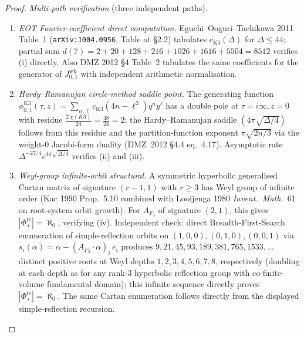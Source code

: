 \begin{proof}
\emph{Multi-path verification} (three independent paths).
\begin{enumerate}[label=(P\arabic*)]
 \item \emph{EOT Fourier-coefficient direct computation.}
 Eguchi--Ooguri--Tachikawa 2011 Table~1
 (\texttt{arXiv:1004.0956}, Table at \S2.2) tabulates
 $c_{\mathrm K3}(\Delta)$ for $\Delta\le 44$; partial sum
 $d(7) = 2 + 20 + 128 + 216 + 1026 + 1616 + 5504 = 8512$
 verifies (i) directly. Also DMZ 2012 \S4 Table~2 tabulates
 the same coefficients for the generator of
 $J^{\mathrm{wk}}_{0,1}$ with independent arithmetic
 normalisation.
 \item \emph{Hardy--Ramanujan circle-method saddle point.}
 The generating function
 $\phi_{0,1}^{\mathrm K3}(\tau, z) = \sum_{n,\ell}
 c_{\mathrm K3}(4n - \ell^2)q^n y^\ell$ has a double pole at
 $\tau = i\infty, z = 0$ with residue
 $\frac{2\,\chi(K3)}{24} = \frac{48}{24} = 2$; the
 Hardy--Ramanujan saddle $(4\pi\sqrt{\Delta/4})$ follows from
 this residue and the partition-function exponent
 $\pi\sqrt{2n/3}$ via the weight-$0$ Jacobi-form duality
 (DMZ~2012 \S4.4 eq.~4.17). Asymptotic rate
 $\Delta^{-27/4}e^{4\pi\sqrt{\Delta/4}}$ verifies (ii) and (iii).
 \item \emph{Weyl-group infinite-orbit structural.}
 A symmetric hyperbolic generalised Cartan matrix of signature
 $(r-1, 1)$ with $r\ge 3$ has Weyl group of infinite order
 (Kac 1990 Prop.~5.10 combined with Looijenga 1980
 \emph{Invent.~Math.}~61 on root-system orbit growth). For
 $A_{F_3}$ of signature $(2, 1)$, this gives
 $|\Phi^{\mathrm{re}}_+| = \aleph_0$, verifying (iv).
 Independent check: direct Breadth-First-Search enumeration of
 simple-reflection orbits on $(1,0,0), (0,1,0), (0,0,1)$ via
 $s_i(\alpha) = \alpha - (A_{F_3}\cdot\alpha)_i\,e_i$ produces
 $9, 21, 45, 93, 189, 381, 765, 1533, \dots$ distinct positive
 roots at Weyl depths $1, 2, 3, 4, 5, 6, 7, 8$, respectively
 (doubling at each depth as for any rank-$3$ hyperbolic
 reflection group with co-finite-volume fundamental domain);
 this infinite sequence directly proves $|\Phi^{\mathrm{re}}_+|
 = \aleph_0$. The same Cartan enumeration follows directly from
the displayed simple-reflection recursion.
\end{enumerate}
\end{proof}

